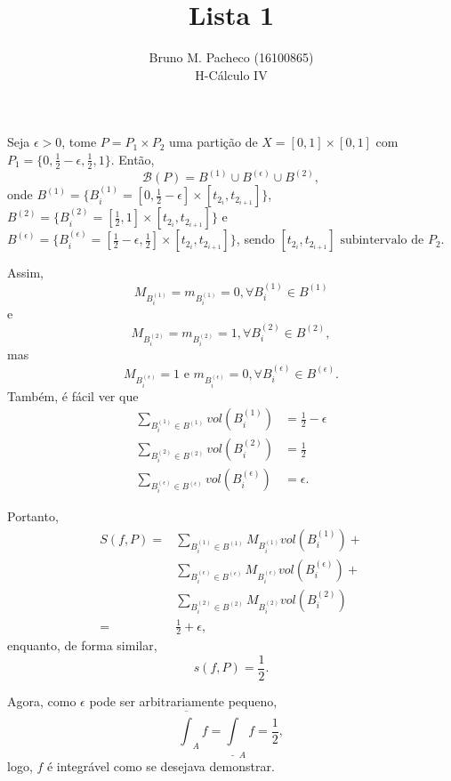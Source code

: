 \documentclass[a4paper]{report}
\begin{document}
 
\title{Lista 1}
\author{Bruno M. Pacheco (16100865)\\
H-Cálculo IV}
 
\maketitle
 

Seja $\epsilon>0$, tome $P = P_1\times P_2$ uma partição de $X=\left[ 0,1 \right] \times \left[ 0,1 \right] $ com $P_1=\{0,\frac{1}{2}-\epsilon, \frac{1}{2},1\} $. Então, \[
\mathcal{B}\left( P \right) = B^{(1)}\cup B^{(\epsilon)}\cup B^{(2)}
,\] onde $B^{(1)}=\{B^{(1)}_i=\left[ 0,\frac{1}{2}-\epsilon \right] \times \left[ t_{2_i},t_{2_{i+1}} \right]\}$, $B^{(2)}=\{B^{(2)}_i=\left[ \frac{1}{2}, 1 \right] \times \left[ t_{2_i},t_{2_{i+1}} \right]\}$ e $B^{(\epsilon)}=\{B^{(\epsilon)}_i=\left[ \frac{1}{2}-\epsilon, \frac{1}{2} \right] \times \left[ t_{2_i},t_{2_{i+1}} \right]\}$, sendo $ \left[ t_{2_i},t_{2_{i+1}} \right] \text{ subintervalo de }P_2 $.

Assim, \[
M_{B^{(1)}_i}=m_{B^{(1)}_i} = 0, \forall B^{(1)}_i\in B^{(1)}
\] e \[
M_{B^{(2)}_i}=m_{B^{(2)}_i} = 1, \forall B^{(2)}_i\in B^{(2)}
,\] mas \[
M_{B^{(\epsilon)}_i}= 1 \text{ e }m_{B^{(\epsilon)}_i} = 0, \forall B^{(\epsilon)}_i\in B^{(\epsilon)}
.\] Também, é fácil ver que
\begin{align*}
    \sum_{B^{(1)}_i\in B^{(1)}} vol\left( B^{(1)}_i \right) &= \frac{1}{2} - \epsilon \\
    \sum_{B^{(2)}_i\in B^{(2)}} vol\left( B^{(2)}_i \right) &= \frac{1}{2} \\
    \sum_{B^{(\epsilon)}_i\in B^{(\epsilon)}} vol\left( B^{(\epsilon)}_i \right) &= \epsilon
.\end{align*}

Portanto,
\begin{align*}
    S\left( f,P \right) = &\sum_{B^{(1)}_i\in B^{(1)}} M_{B^{(1)}_i} vol\left( B^{(1)}_i \right) + \\
			  &\sum_{B^{(\epsilon)}_i\in B^{(\epsilon)}} M_{B^{(\epsilon)}_i} vol\left( B^{(\epsilon)}_i \right) + \\
&\sum_{B^{(2)}_i\in B^{(2)}} M_{B^{(2)}_i} vol\left( B^{(2)}_i \right)\\
    =& \frac{1}{2} + \epsilon
,\end{align*}
enquanto, de forma similar, \[
s\left( f,P \right) = \frac{1}{2}
.\] 

Agora, como $\epsilon$ pode ser arbitrariamente pequeno, \[
    \overline{\int}_A f = \underline{\int}_A f = \frac{1}{2}
,\] logo, $f$ é integrável como se desejava demonstrar.
\end{document}
